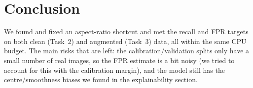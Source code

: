 \section{Conclusion}
We found and fixed an aspect-ratio shortcut and met the recall and FPR targets
on both clean (Task~2) and augmented (Task~3) data, all within the same CPU
budget.
The main risks that are left: the calibration/validation splits only have a
small number of real images, so the FPR estimate is a bit noisy (we tried to
account for this with the calibration margin), and the model still has the
centre/smoothness biases we found in the explainability section.